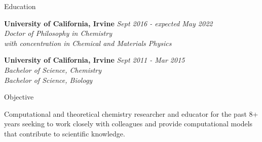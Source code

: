 \documentclass{resume} %
\begin{document}
{\centerline { } }

\begin{rSection}{Education}

{\bf University of California, Irvine} \hfill {\em Sept 2016 - expected May 2022} 
\\{\textit{Doctor of Philosophy in Chemistry \\
    with concentration in Chemical and Materials Physics}}

{\bf University of California, Irvine} \hfill {\em Sept 2011 - Mar 2015} 
\\ { \textit{Bachelor of Science, Chemistry}} \hfill
\\ { \textit{Bachelor of Science, Biology}} \hfill


\end{rSection}

\begin{rSection}{Objective}
  
  Computational and theoretical chemistry researcher and educator for the past 8+ years
  seeking to work closely with colleagues and provide computational models that contribute
  to scientific knowledge. 

\end{rSection}
\end{document}
